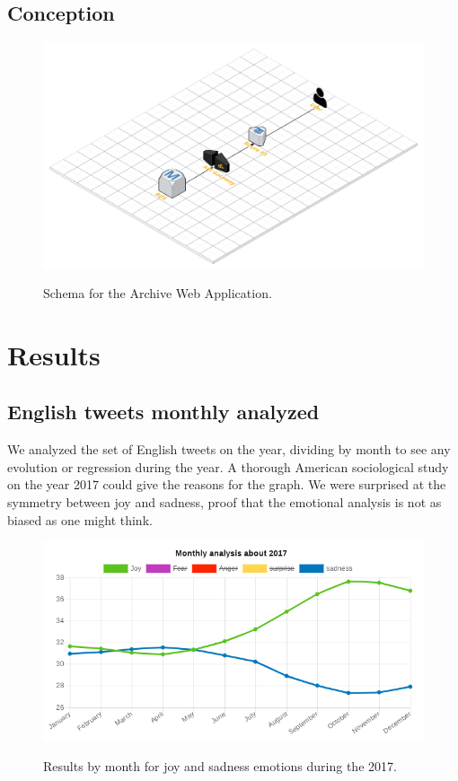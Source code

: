 \documentclass{acmtog} %
\begin{document}
\subsection{Conception}
\label{subsub:conception}

\begin{figure}[h!]
{\includegraphics[width=\linewidth]{archive-schema.png}}
\caption{Schema for the Archive Web Application.}
  \label{fig:archive}
\end{figure}



\section{Results}
\label{sub:results}

\subsection{English tweets monthly analyzed}
\label{subsub:english_tweets_monthly}

We analyzed the set of English tweets on the year, dividing by month to see any evolution or regression during the year. A thorough American sociological study on the year 2017 could give the reasons for the graph. We were surprised at the symmetry between joy and sadness, proof that the emotional analysis is not as biased as one might think. 


\begin{figure}[h!]
{\includegraphics[width=\linewidth]{monthly_analysis_joy_sadness-exemple.png}}
\caption{Results by month for joy and sadness emotions during the 2017.}
  \label{fig:trump_results}
\end{figure}
\end{document}
